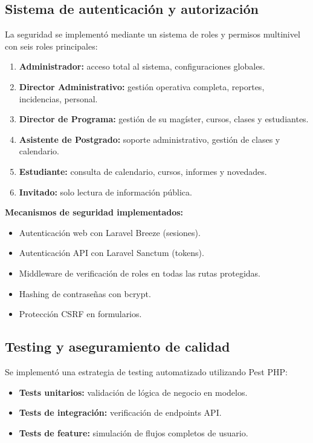 \subsection{Sistema de autenticación y autorización}

La seguridad se implementó mediante un sistema de roles y permisos multinivel con seis roles principales:

\begin{enumerate}
    \item \textbf{Administrador:} acceso total al sistema, configuraciones globales.
    \item \textbf{Director Administrativo:} gestión operativa completa, reportes, incidencias, personal.
    \item \textbf{Director de Programa:} gestión de su magíster, cursos, clases y estudiantes.
    \item \textbf{Asistente de Postgrado:} soporte administrativo, gestión de clases y calendario.
    \item \textbf{Estudiante:} consulta de calendario, cursos, informes y novedades.
    \item \textbf{Invitado:} solo lectura de información pública.
\end{enumerate}

\textbf{Mecanismos de seguridad implementados:}

\begin{itemize}
    \item Autenticación web con Laravel Breeze (sesiones).
    \item Autenticación API con Laravel Sanctum (tokens).
    \item Middleware de verificación de roles en todas las rutas protegidas.
    \item Hashing de contraseñas con bcrypt.
    \item Protección CSRF en formularios.
\end{itemize}

\subsection{Testing y aseguramiento de calidad}

Se implementó una estrategia de testing automatizado utilizando Pest PHP:

\begin{itemize}
    \item \textbf{Tests unitarios:} validación de lógica de negocio en modelos.
    \item \textbf{Tests de integración:} verificación de endpoints API.
    \item \textbf{Tests de feature:} simulación de flujos completos de usuario.
\end{itemize}

